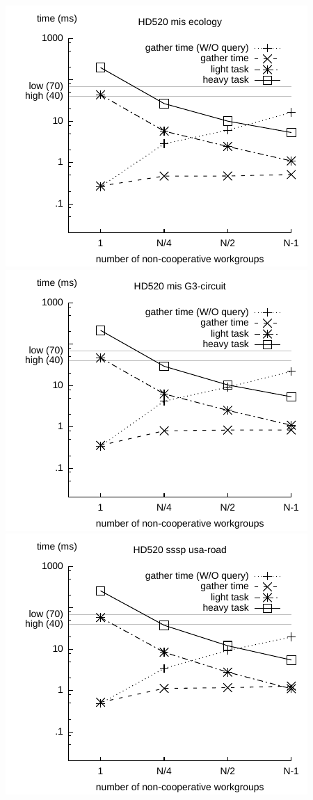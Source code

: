 \documentclass[parskip=half,sigconf,review, anonymous=true, acmcopyrightmode=none]{acmart}
\begin{document}
\includegraphics[width=.7\columnwidth]{images/barrier/hd520_mis_ecology.pdf} \\
\includegraphics[width=.7\columnwidth]{images/barrier/hd520_mis_G3_circuit.pdf} \\
\includegraphics[width=.7\columnwidth]{images/barrier/hd520_sssp_usa_road.pdf} \\
\end{document}
